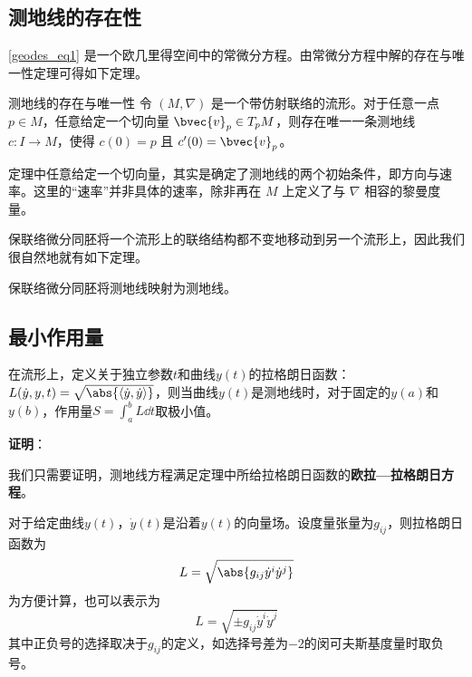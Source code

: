 \subsection{测地线的存在性}

\autoref{geodes_eq1} 是一个欧几里得空间中的常微分方程。由常微分方程中解的存在与唯一性定理可得如下定理。

\begin{theorem}{测地线的存在与唯一性}
令 $(M, \nabla)$ 是一个带仿射联络的流形。对于任意一点 $p\in M$，任意给定一个切向量 $\bvec{v}_p\in T_pM$，则存在唯一一条测地线 $c:I\to M$，使得 $c(0)=p$ 且 $c'(0)=\bvec{v}_p$。
\end{theorem}

定理中任意给定一个切向量，其实是确定了测地线的两个初始条件，即方向与速率。这里的“速率”并非具体的速率，除非再在 $M$ 上定义了与 $\nabla$ 相容的黎曼度量。

保联络微分同胚将一个流形上的联络结构都不变地移动到另一个流形上，因此我们很自然地就有如下定理。

\begin{theorem}{}
保联络微分同胚将测地线映射为测地线。
\end{theorem}



\subsection{最小作用量}

\begin{theorem}{}
在流形上，定义关于独立参数$t$和曲线$y(t)$的拉格朗日函数：$L(\dot{y}, y, t) = \sqrt{\abs{\langle \dot{y}, \dot{y} \rangle}}$，则当曲线$y(t)$是测地线时，对于固定的$y(a)$和$y(b)$，作用量$S=\int_a^b L \dd t$取极小值。
\end{theorem}

\textbf{证明}：

我们只需要证明，测地线方程满足定理中所给拉格朗日函数的\textbf{欧拉—拉格朗日方程}。

对于给定曲线$y(t)$，$\dot{y}(t)$是沿着$y(t)$的向量场。设度量张量为$g_{ij}$，则拉格朗日函数为
\begin{equation}
L = \sqrt{\abs{g_{ij}\dot{y}^i\dot{y}^j}}
\end{equation}
为方便计算，也可以表示为
\begin{equation}
L = \sqrt{\pm{g_{ij}\dot{y}^i\dot{y}^j}}
\end{equation}
其中正负号的选择取决于$g_{ij}$的定义，如选择号差为$-2$的闵可夫斯基度量时取负号。

